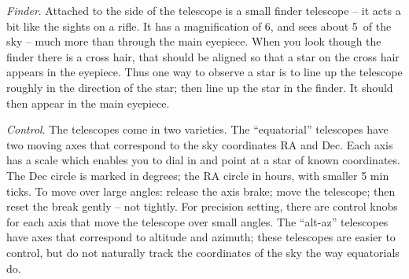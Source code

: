 \medskip \noindent \emph{Finder}. Attached to the side of the
telescope is a small finder telescope -- it acts a bit like the sights
on a rifle. It has a magnification of 6, and sees about 5\deg\ of the
sky -- much more than through the main eyepiece. When you look though
the finder there is a cross hair, that should be aligned so that a
star on the cross hair appears in the eyepiece. Thus one way to
observe a star is to line up the telescope roughly in the direction of
the star; then line up the star in the finder. It should then appear
in the main eyepiece.

\medskip \noindent \emph{Control}. The telescopes come in two
varieties.  The ``equatorial'' telescopes have two moving axes that
correspond to the sky coordinates RA and Dec. Each axis has a scale
which enables you to dial in and point at a star of known
coordinates. The Dec circle is marked in degrees; the RA circle in
hours, with smaller 5 min ticks. To move over large angles: release
the axis brake; move the telescope; then reset the break gently -- not
tightly. For precision setting, there are control knobs for each axis
that move the telescope over small angles. The ``alt-az'' telescopes
have axes that correspond to altitude and azimuth; these telescopes
are easier to control, but do not naturally track the coordinates of
the sky the way equatorials do.

